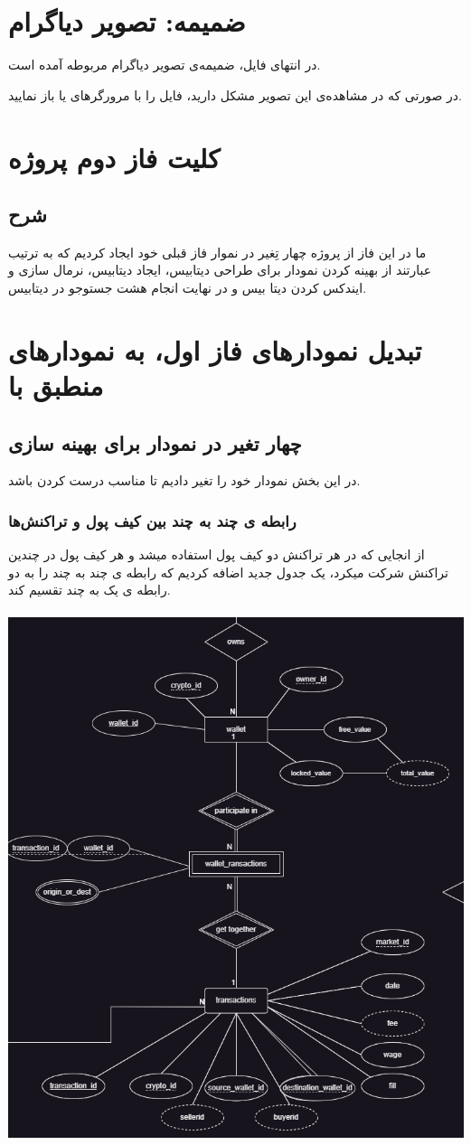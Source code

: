 \documentclass{book}
\begin{document}
\chapter{ضمیمه: تصویر دیاگرام }
در انتهای فایل، ضمیمه‌ی تصویر دیاگرام مربوطه آمده است.

در صورتی که در مشاهده‌ی این تصویر مشکل دارید، فایل  را با مرورگرهای  یا  باز نمایید.


\chapter{کلیت فاز دوم پروژه}
\section{شرح}
ما در این فاز از پروژه چهار تِغیر در نموار فاز قبلی خود ایجاد کردیم که به ترتیب عبارتند از بهینه کردن نمودار برای طراحی دیتابیس، ایجاد دیتابیس، نرمال سازی و ایندکس کردن دیتا بیس و در نهایت انجام هشت جستوجو در دیتابیس.
\chapter{تبدیل نمودار‌های‌‌ فاز اول، به نمودار‌های منطبق با }
\section{چهار تغیر در نمودار برای بهینه سازی}
در این بخش نمودار خود را تغیر دادیم تا مناسب درست کردن  باشد.
\newpage

\subsection{رابطه ی چند به چند بین کیف پول و تراکنش‌ها}
از انجایی که در هر تراکنش دو کیف پول استفاده میشد و هر کیف پول در چندین تراکنش شرکت میکرد، یک جدول جدید اضافه کردیم که رابطه ی چند به چند را به دو رابطه ی یک به چند تقسیم کند.
\\ \\
\includegraphics[width=0.8\linewidth]{wallets_transactions.png}
\newpage
\end{document}
